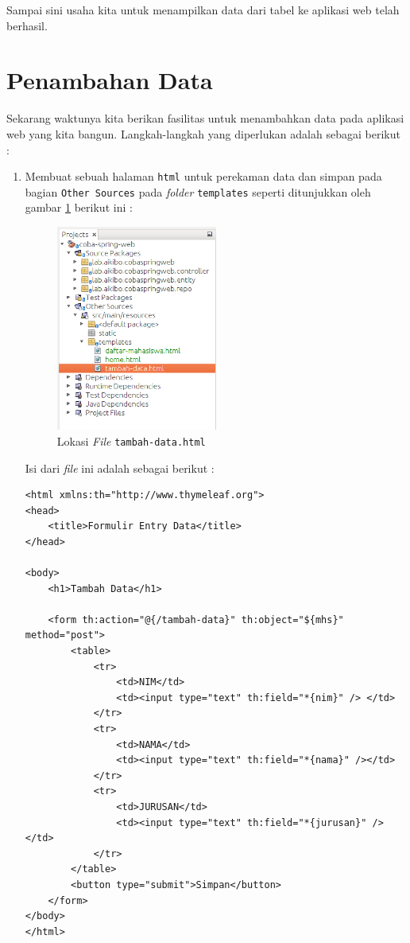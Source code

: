 	Sampai sini usaha kita untuk menampilkan data dari tabel ke aplikasi web telah berhasil.

\section{Penambahan Data}

Sekarang waktunya kita berikan fasilitas untuk menambahkan data pada aplikasi web yang kita bangun. Langkah-langkah yang diperlukan adalah sebagai berikut :

\begin{enumerate}
	\item Membuat sebuah halaman \texttt{html} untuk perekaman data dan simpan pada bagian \texttt{Other Sources} pada \textit{folder} \texttt{templates} seperti ditunjukkan oleh gambar \ref{fig:letak-tambah-data} berikut ini :
	
	\begin{figure}[H]
		\centering
		\includegraphics[width=0.5\textwidth]{./resources/014-lokasi-tambah-data}
		\caption{Lokasi \textit{File} \texttt{tambah-data.html}}
		\label{fig:letak-tambah-data}
	\end{figure}
	
	Isi dari \textit{file} ini adalah sebagai berikut :
	
	\begin{lstlisting}
<html xmlns:th="http://www.thymeleaf.org">
<head>
	<title>Formulir Entry Data</title>
</head>

<body>
	<h1>Tambah Data</h1>

	<form th:action="@{/tambah-data}" th:object="${mhs}" method="post">
		<table>
			<tr>
				<td>NIM</td>
				<td><input type="text" th:field="*{nim}" /> </td>
			</tr>
			<tr>
				<td>NAMA</td>
				<td><input type="text" th:field="*{nama}" /></td>
			</tr>
			<tr>
				<td>JURUSAN</td>
				<td><input type="text" th:field="*{jurusan}" /></td>
			</tr>
		</table>
		<button type="submit">Simpan</button>
	</form>
</body>
</html>
	\end{lstlisting}	
	

\end{enumerate}
